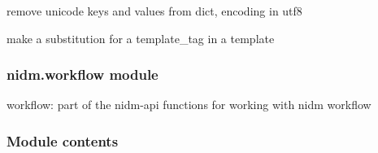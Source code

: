 \documentclass[letterpaper,10pt,english]{sphinxmanual}
\begin{document}

\begin{fulllineitems}
\label{nidm:nidm.utils.remove_unicode_dict}
remove unicode keys and values from dict, encoding in utf8

\end{fulllineitems}


\begin{fulllineitems}
\label{nidm:nidm.utils.save_template}
\end{fulllineitems}


\begin{fulllineitems}
\label{nidm:nidm.utils.set_permissions}
\end{fulllineitems}


\begin{fulllineitems}
\label{nidm:nidm.utils.sub_template}
make a substitution for a template\_tag in a template

\end{fulllineitems}



\subsubsection{nidm.workflow module}
\label{nidm:nidm-workflow-module}\label{nidm:module-nidm.workflow}
workflow: part of the nidm-api
functions for working with nidm workflow


\subsubsection{Module contents}
\label{nidm:module-nidm}\label{nidm:module-contents}
\end{document}

